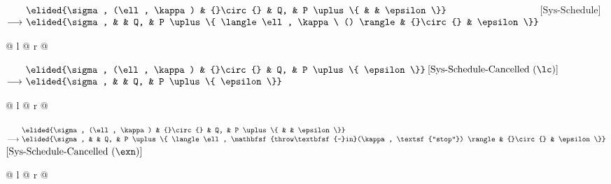 \noindent
$\begin{array}[t]{@{}r@{\ }l@{}l@{}l@{\ }l@{}l@{}l@{}}
                & \elided{\sigma, (\ell, \kappa) & {}\circ{} & Q, & P \uplus \{ & & \epsilon \}} \\
\longrightarrow & \elided{\sigma,                &           & Q, & P \uplus \{ \langle \ell, \kappa\ () \rangle & {}\circ{} & \epsilon \}}
\end{array}$\hfill$\text{[Sys-Schedule]}$\par
\noindent
\begin{tabular*}{\linewidth}{@{} l @{\extracolsep{\fill}} r @{}}
\end{tabular*}

\vspace{1em}
\noindent
$\begin{array}[t]{@{}r@{\ }l@{}l@{}l@{\ }l@{}}
                & \elided{\sigma, (\ell, \kappa) & {}\circ{} & Q, & P \uplus \{ \epsilon \}} \\
\longrightarrow & \elided{\sigma,                &           & Q, & P \uplus \{ \epsilon \}}
\end{array}$\hfill$\text{[Sys-Schedule-Cancelled (\lc)]}$\par
\noindent
\begin{tabular*}{\linewidth}{@{} l @{\extracolsep{\fill}} r @{}}
\end{tabular*}

\vspace{1em}
\noindent
$\begin{array}[t]{@{}r@{\ }l@{}l@{}l@{\ }l@{}l@{}l@{}}
                & \elided{\sigma, (\ell, \kappa) & {}\circ{} & Q, & P \uplus \{ & & \epsilon \}} \\
\longrightarrow & \elided{\sigma,                &           & Q, & P \uplus \{ \langle \ell, \mathbfsf{throw\textbfsf{-}in}(\kappa, \textsf{``stop''}) \rangle & {}\circ{} & \epsilon \}}
\end{array}$\hfill$\text{[Sys-Schedule-Cancelled (\exn)]}$\par
\noindent
\begin{tabular*}{\linewidth}{@{} l @{\extracolsep{\fill}} r @{}}
\end{tabular*}

